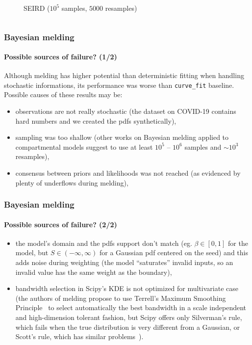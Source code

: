 \documentclass[aspectratio=43]{beamer}
\begin{document}
\begin{frame}
\begin{columns}
\begin{figure}
			\caption{SEIRD ($10^5$ samples, $5000$ resamples)}
		\end{figure}
	\end{columns}
\end{frame}

\begin{frame}
	\frametitle{Bayesian melding}
	\framesubtitle{Possible sources of failure? (1/2)}
Although melding has higher potential than deterministic fitting when handling stochastic informations, its performance was worse than \texttt{curve\_fit} baseline. Possible causes of these results may be:
	\begin{itemize}
		\item observations are not really stochastic (the dataset on COVID-19 contains hard numbers and we created the pdfs synthetically),
		\item sampling was too shallow (other works on Bayesian melding applied to compartmental models suggest to use at least $10^5 \text{ -- } 10^6$ samples and $\sim 10^3$ resamples),
		\item consensus between priors and likelihoods was not reached (as evidenced by plenty of underflows during melding),
	\end{itemize}
\end{frame}

\begin{frame}
	\frametitle{Bayesian melding}
	\framesubtitle{Possible sources of failure? (2/2)}
	\begin{itemize}
		\item the model's domain and the pdfs support don't match (eg. $\beta \in [0, 1]$ for the model, but $S \in (-\infty, \infty)$ for a Gaussian pdf centered on the seed) and this adds noise during weighting (the model ``saturates'' invalid inputs, so an invalid value has the same weight as the boundary),
		\item bandwidth selection in Scipy's KDE is not optimized for multivariate case (the authors of melding propose to use Terrell's Maximum Smoothing Principle~ to select automatically the best bandwidth in a scale independent and high-dimension tolerant fashion, but Scipy offers only Silverman's rule, which fails when the true distribution is very different from a Gaussian, or Scott's rule, which has similar problems~).
	\end{itemize}
\end{frame}

\appendix
\end{document}
